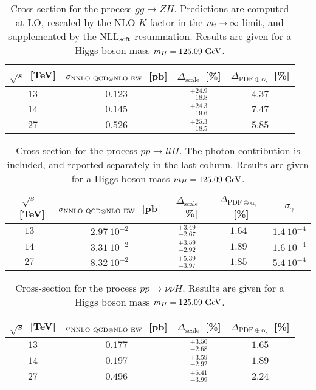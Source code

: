 \begin{table}
\centering
\begin{tabular}{cccc}
\toprule
$\sqrt{s}$~[TeV] & $\sigma_{{\rm NNLO~QCD}\otimes{\rm NLO~EW}}$~[pb] & $\Delta_{\mathrm{scale}}$~[\%] &
$\Delta_{\mathrm{PDF\oplus\alpha_s}}$~[\%] \\
\midrule
$13$ & $0.123$ & $^{+24.9}_{-18.8}$ & $4.37$ \\
$14$ & $0.145$ & $^{+24.3}_{-19.6}$ & $7.47$ \\
$27$ & $0.526$ & $^{+25.3}_{-18.5}$ & $5.85$ \\
\bottomrule
\end{tabular}
\caption{Cross-section for the process $g g  \to ZH$. Predictions are computed 
at LO, rescaled by the NLO $K$-factor in the $m_t \to \infty$ limit,
and supplemented by the NLL$_{\rm soft}$ resummation. Results are given for a Higgs boson mass $m_H = 125.09~{\rm GeV}$.}
\label{tab:ggZH_xsec}
\end{table}

\begin{table}
\centering
\begin{tabular}{cccc|c}
\toprule
$\sqrt{s}$~[TeV] & $\sigma_{{\rm NNLO~QCD}\otimes{\rm NLO~EW}}$~[pb] & $\Delta_{\mathrm{scale}}$~[\%] &
$\Delta_{\mathrm{PDF\oplus\alpha_s}}$~[\%] & $\sigma_{\gamma}$\\
\midrule
$13$ & $2.97~10^{-2}$ & $^{+3.49}_{-2.67}$ & $1.64$ & $1.4~10^{-4}$\\
$14$ & $3.31~10^{-2}$ & $^{+3.59}_{-2.92}$ & $1.89$ & $1.6~10^{-4}$\\
$27$ & $8.32~10^{-2}$ & $^{+5.39}_{-3.97}$ & $1.85$ & $5.4~10^{-4}$\\
\bottomrule
\end{tabular}
\caption{Cross-section for the process $p p   \to l\bar lH$. The photon contribution is included,
and reported separately in the last column.  Results are given for a Higgs boson mass $m_H = 125.09~{\rm GeV}$.}
\label{tab:llZH_xsec}
\end{table}

\begin{table}
\centering
\begin{tabular}{cccc}
\toprule
$\sqrt{s}$~[TeV] & $\sigma_{{\rm NNLO~QCD}\otimes{\rm NLO~EW}}$~[pb] & $\Delta_{\mathrm{scale}}$~[\%] &
$\Delta_{\mathrm{PDF\oplus\alpha_s}}$~[\%] \\
\midrule
$13$ & $0.177$ & $^{+3.50}_{-2.68}$ & $1.65$ \\
$14$ & $0.197$ & $^{+3.59}_{-2.92}$ & $1.89$ \\
$27$ & $0.496$ & $^{+5.41}_{-3.99}$ & $2.24$ \\
\bottomrule
\end{tabular}
\caption{Cross-section for the process $p p   \to \nu\bar \nu H$. Results are given for a Higgs boson mass $m_H = 125.09~{\rm GeV}$.}
\label{tab:nnZH_xsec}
\end{table}



